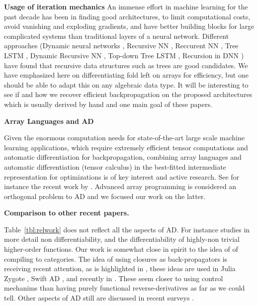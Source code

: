 \noindent \textbf{Usage of iteration mechanics}
An immense effort in machine learning for the past decade has been in finding
good architectures, to limit computational costs, 
avoid vanishing and exploding gradients, 
and have better building blocks for large complicated systems than traditional layers of a neural network.
Different approaches 
(Dynamic neural networks \cite{jin2017manipulability,wu2016deep}, 
Recursive NN \cite{socher2011parsing,biancofiore2017recursive}, 
Reccurent NN \cite{bahdanau2014neural,luong2015effective}, 
Tree LSTM \cite{tai2015improved,chen2016enhanced}, 
Dynamic Recursive NN \cite{guo2019dynamic}, 
Top-down Tree LSTM \cite{zhang2015top}, 
Recursion in DNN \cite{jeong2018improving}) 
have found that recursive data structures such as trees are good candidates.
We have emphasized here on differentiating fold left on arrays for efficiency, 
but one should be able to adapt this on any algebraic data type. 
It will be interesting to see if and how we recover efficient backpropagation on the proposed architectures 
which is usually derived by hand and one main goal of these papers.

\noindent \textbf{Array Languages and AD}

Given the enormous computation needs for state-of-the-art large scale machine learning applications, 
which require extremely efficient tensor computations and automatic differentiation for backpropagation, 
combining array languages and automatic differentiation (tensor calculus) in the best-fitted 
intermediate representation for optimizations is of key interest and active research. 
See for instance the recent work by \cite{bernstein2020differentiating,laue2018computing,laue2020simple}.
Advanced array programming is considered an orthogonal problem to AD and we focused our work on the latter.

\noindent \textbf{Comparison to other recent papers.}

Table~\ref{tbl:relwork} does not reflect all the aspects of AD. For instance \cite{lee2020correctness} studies in more detail non differentiability, 
and \cite{sherman2021} the differentiability of highly-non trivial higher-order functions. 
Our work is somewhat close in spirit to the idea of \cite{elliott2018simple} of compiling to categories.
The idea of using closures as back-propagators is receiving recent attention, as is highlighted in \cite{vytiniotis2019differentiable},
these ideas are used in Julia Zygote \cite{innes2019zygote}, Swift AD \cite{wei2018first}, and recently in \cite{paszke2021getting}.
These seem closer to using control mechanims than having purely functional reverse-derivatives as far as we could tell.
Other aspects of AD still are discussed in recent surveys \cite{van2018automatic,baydin2017automatic}.

